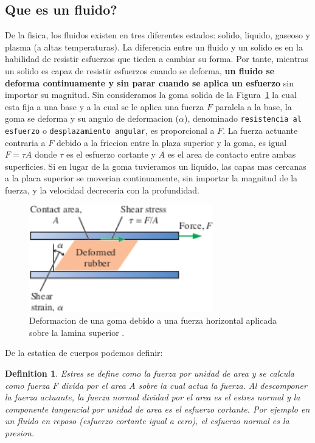 \documentclass[10pt, oneside]{article}
\newtheorem{defn}{Definition}
\begin{document}
\subsection{Que es un fluido?}
De la fisica, los fluidos existen en tres diferentes estados: solido, liquido, gaseoso y plasma (a altas temperaturas). La diferencia entre un fluido y un solido es en la habilidad de resistir esfuerzos que tieden a cambiar su forma. Por tante, mientras un solido es capaz de resistir esfuerzos cuando se deforma, \textbf{un fluido se deforma continuamente y sin parar cuando se aplica un esfuerzo} sin importar su magnitud. Sin consideramos la goma solida de la Figura~\ref{f1} la cual esta fija a una base y a la cual se le aplica una fuerza $F$ paralela a la base, la goma se deforma y su angulo de deformacion ($\alpha$), denominado \texttt{resistencia al esfuerzo} o \texttt{desplazamiento angular}, es proporcional a $F$. La fuerza actuante contraria a $F$ debido a la friccion entre la plaza superior y la goma, es igual $F=\tau A$ donde $\tau$ es el esfuerzo cortante y $A$ es el area de contacto entre ambas superficies. Si en lugar de la goma tuvieramos un liquido, las capas mas cercanas a la placa superior se moverian continuamente, sin importar la magnitud de la fuerza, y la velocidad decreceria con la profundidad.

\begin{figure}[h]
\centering
\includegraphics[width=8cm]{fig1}
\caption{Deformacion de una goma debido a una fuerza horizontal aplicada sobre la lamina superior \cite{this}.}
\label{f1}
\end{figure}


De la estatica de cuerpos podemos definir:
\begin{defn}
Estres se define como la fuerza por unidad de area y se calcula como fuerza $F$ divida por el area $A$ sobre la cual actua la fuerza. Al descomponer la fuerza actuante, la fuerza normal dividad por el area es el estres normal y la componente tangencial por unidad de area es el esfuerzo cortante. Por ejemplo en un fluido en reposo (esfuerzo cortante igual a cero), el esfuerzo normal es la presion.
\end{defn} 
\end{document}
